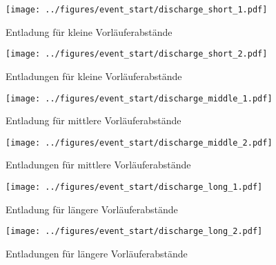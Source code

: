 \begin{figure}[H]
    \centering
    \begin{minipage}[t]{0.44\textwidth}
        \centering
        \texttt{[image: ../figures/event\_start/discharge\_short\_1.pdf]}
        \caption{Entladung für kleine Vorläuferabstände}
        \label{fig:discharge-vor-klein-1}
    \end{minipage}
    \hfill
    \begin{minipage}[t]{0.44\textwidth}
        \centering
        \texttt{[image: ../figures/event\_start/discharge\_short\_2.pdf]}
        \caption{Entladungen für kleine Vorläuferabstände}
        \label{fig:discharge-vor-klein-2}
    \end{minipage}
\end{figure}



\begin{figure}[H]
    \centering
    \begin{minipage}[t]{0.44\textwidth}
        \centering
        \texttt{[image: ../figures/event\_start/discharge\_middle\_1.pdf]}
        \caption{Entladung für mittlere Vorläuferabstände}
        \label{fig:discharge-vor-mittel-1}
    \end{minipage}
    \hfill
    \begin{minipage}[t]{0.44\textwidth}
        \centering
        \texttt{[image: ../figures/event\_start/discharge\_middle\_2.pdf]}
        \caption{Entladungen für mittlere Vorläuferabstände}
        \label{fig:discharge-vor-mittel-2}
    \end{minipage}
\end{figure}

\begin{figure}[H]
    \centering
    \begin{minipage}[t]{0.44\textwidth}
        \centering
        \texttt{[image: ../figures/event\_start/discharge\_long\_1.pdf]}
        \caption{Entladung für längere Vorläuferabstände}
        \label{fig:discharge-vor-lang-1}
    \end{minipage}
    \hfill
    \begin{minipage}[t]{0.44\textwidth}
        \centering
        \texttt{[image: ../figures/event\_start/discharge\_long\_2.pdf]}
        \caption{Entladungen für längere Vorläuferabstände}
        \label{fig:discharge-vor-lang-2}
    \end{minipage}
\end{figure}


